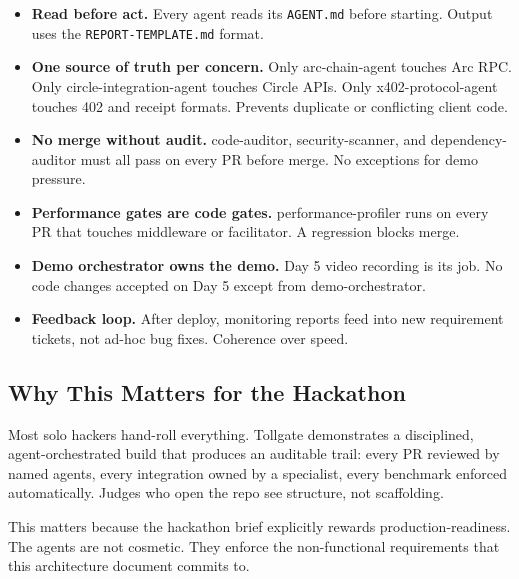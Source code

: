 \documentclass[11pt,a4paper]{article}
\newcommand{\iconCheck}{\textcolor{tollgategreen}{\faCheckCircle}}
\newcommand{\iconStar}{\textcolor{tollgategold}{\faStar}}
\begin{document}
\begin{flowbox}[title={\iconCheck~ How agents pass work to each other}]
\begin{itemize}[leftmargin=*]
  \item \textbf{Read before act.} Every agent reads its \texttt{AGENT.md} before starting. Output uses the \texttt{REPORT-TEMPLATE.md} format.
  \item \textbf{One source of truth per concern.} Only arc-chain-agent touches Arc RPC. Only circle-integration-agent touches Circle APIs. Only x402-protocol-agent touches 402 and receipt formats. Prevents duplicate or conflicting client code.
  \item \textbf{No merge without audit.} code-auditor, security-scanner, and dependency-auditor must all pass on every PR before merge. No exceptions for demo pressure.
  \item \textbf{Performance gates are code gates.} performance-profiler runs on every PR that touches middleware or facilitator. A regression blocks merge.
  \item \textbf{Demo orchestrator owns the demo.} Day 5 video recording is its job. No code changes accepted on Day 5 except from demo-orchestrator.
  \item \textbf{Feedback loop.} After deploy, monitoring reports feed into new requirement tickets, not ad-hoc bug fixes. Coherence over speed.
\end{itemize}
\end{flowbox}

\subsection{Why This Matters for the Hackathon}

\begin{archbox}[title={\iconStar~ Agent orchestration is a judge-signal}]
Most solo hackers hand-roll everything. Tollgate demonstrates a disciplined, agent-orchestrated build that produces an auditable trail: every PR reviewed by named agents, every integration owned by a specialist, every benchmark enforced automatically. Judges who open the repo see structure, not scaffolding.

This matters because the hackathon brief explicitly rewards production-readiness. The agents are not cosmetic. They enforce the non-functional requirements that this architecture document commits to.
\end{archbox}

\newpage
\end{document}
